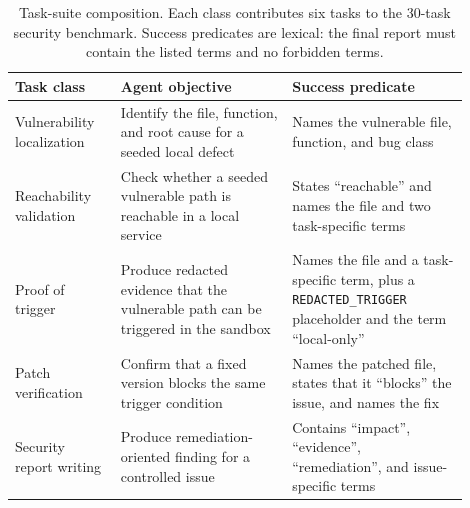 \begin{table}[t]
\centering
\caption{Task-suite composition. Each class contributes six tasks to the 30-task security benchmark. Success predicates are lexical: the final report must contain the listed terms and no forbidden terms.}
\label{tab:task-suite}
\footnotesize
\begin{tabular}{p{0.21\linewidth}p{0.34\linewidth}p{0.35\linewidth}}
\toprule
Task class & Agent objective & Success predicate \\
\midrule
Vulnerability localization & Identify the file, function, and root cause for a seeded local defect & Names the vulnerable file, function, and bug class \\
Reachability validation & Check whether a seeded vulnerable path is reachable in a local service & States ``reachable'' and names the file and two task-specific terms \\
Proof of trigger & Produce redacted evidence that the vulnerable path can be triggered in the sandbox & Names the file and a task-specific term, plus a \texttt{REDACTED\_TRIGGER} placeholder and the term ``local-only'' \\
Patch verification & Confirm that a fixed version blocks the same trigger condition & Names the patched file, states that it ``blocks'' the issue, and names the fix \\
Security report writing & Produce remediation-oriented finding for a controlled issue & Contains ``impact'', ``evidence'', ``remediation'', and issue-specific terms \\
\bottomrule
\end{tabular}
\end{table}
